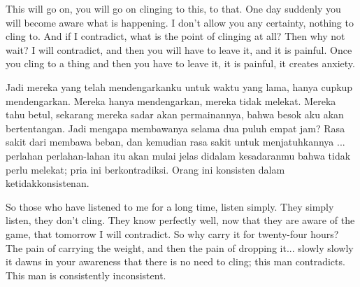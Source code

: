 \english
This will go on, you will go on clinging to this, to that. One day suddenly you will become aware what is happening. I don't allow you any certainty, nothing to cling to. And if I contradict, what is the point of clinging at all? Then why not wait? I will contradict, and then you will have to leave it, and it is painful. Once you cling to a thing and then you have to leave it, it is painful, it creates anxiety.

\bahasa
Jadi mereka yang telah mendengarkanku untuk waktu yang lama, hanya cupkup mendengarkan. Mereka hanya mendengarkan, mereka tidak melekat. Mereka tahu betul, sekarang mereka sadar akan permainannya, bahwa besok aku akan bertentangan. Jadi mengapa membawanya selama dua puluh empat jam? Rasa sakit dari membawa beban, dan kemudian rasa sakit untuk menjatuhkannya ... perlahan perlahan-lahan itu akan mulai jelas didalam kesadaranmu bahwa tidak perlu melekat; pria ini berkontradiksi. Orang ini konsisten dalam ketidakkonsistenan.

\english
So those who have listened to me for a long time, listen simply. They simply listen, they don't cling. They know perfectly well, now that they are aware of the game, that tomorrow I will contradict. So why carry it for twenty-four hours? The pain of carrying the weight, and then the pain of dropping it... slowly slowly it dawns in your awareness that there is no need to cling; this man contradicts. This man is consistently inconsistent.

\bahasa

\english



















